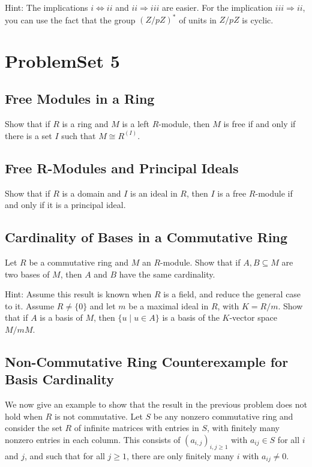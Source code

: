 \documentclass[lang=cn,11pt]{template}
\begin{document}
Hint: The implications \( i \Leftrightarrow ii \) and \( ii \Rightarrow iii \) are easier. For the implication \( iii \Rightarrow ii \), you can use the fact that the group \( (Z/pZ)^* \) of units in \( Z/pZ \) is cyclic.
















\chapter{ProblemSet 5}

\section{Free Modules in a Ring}
Show that if \( R \) is a ring and \( M \) is a left \( R \)-module, then \( M \) is free if and only if there is a set \( I \) such that \( M \cong R^{(I)} \).

\section{Free R-Modules and Principal Ideals}
Show that if \( R \) is a domain and \( I \) is an ideal in \( R \), then \( I \) is a free \( R \)-module if and only if it is a principal ideal.

\section{Cardinality of Bases in a Commutative Ring}
Let \( R \) be a commutative ring and \( M \) an \( R \)-module. Show that if \( A, B \subseteq M \) are two bases of \( M \), then \( A \) and \( B \) have the same cardinality.

Hint: Assume this result is known when \( R \) is a field, and reduce the general case to it. Assume \( R \neq \{0\} \) and let \( m \) be a maximal ideal in \( R \), with \( K = R/m \). Show that if \( A \) is a basis of \( M \), then \( \{u \mid u \in A\} \) is a basis of the \( K \)-vector space \( M/mM \).

\section{Non-Commutative Ring Counterexample for Basis Cardinality}
We now give an example to show that the result in the previous problem does not hold when \( R \) is not commutative. Let \( S \) be any nonzero commutative ring and consider the set \( R \) of infinite matrices with entries in \( S \), with finitely many nonzero entries in each column. This consists of \( (a_{i,j})_{i,j \geq 1} \) with \( a_{ij} \in S \) for all \( i \) and \( j \), and such that for all \( j \geq 1 \), there are only finitely many \( i \) with \( a_{ij} \neq 0 \).
\end{document}
